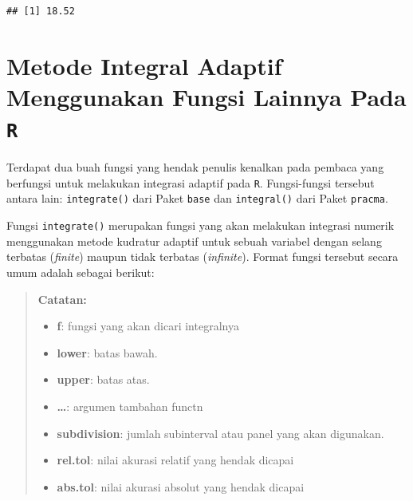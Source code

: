 \documentclass[
]{book}
\newenvironment{Shaded}{\begin{snugshade}}{\end{snugshade}}
\newcommand{\AttributeTok}[1]{\textcolor[rgb]{0.13,0.29,0.53}{#1}}
\newcommand{\FloatTok}[1]{\textcolor[rgb]{0.00,0.00,0.81}{#1}}
\newcommand{\FunctionTok}[1]{\textcolor[rgb]{0.13,0.29,0.53}{\textbf{#1}}}
\newcommand{\NormalTok}[1]{#1}
\newcommand{\SpecialCharTok}[1]{\textcolor[rgb]{0.81,0.36,0.00}{\textbf{#1}}}
\providecommand{\tightlist}{%
  \setlength{\itemsep}{0pt}\setlength{\parskip}{0pt}}
\theoremstyle{definition}
\theoremstyle{definition}
\theoremstyle{definition}
\theoremstyle{definition}
\theoremstyle{remark}
\begin{document}
\begin{verbatim}
## [1] 18.52
\end{verbatim}

\hypertarget{metode-integral-adaptif-menggunakan-fungsi-lainnya-pada-r}{%
\section{\texorpdfstring{Metode Integral Adaptif Menggunakan Fungsi Lainnya Pada \texttt{R}}{Metode Integral Adaptif Menggunakan Fungsi Lainnya Pada R}}\label{metode-integral-adaptif-menggunakan-fungsi-lainnya-pada-r}}

Terdapat dua buah fungsi yang hendak penulis kenalkan pada pembaca yang berfungsi untuk melakukan integrasi adaptif pada \texttt{R}. Fungsi-fungsi tersebut antara lain: \texttt{integrate()} dari Paket \texttt{base} dan \texttt{integral()} dari Paket \texttt{pracma}.

Fungsi \texttt{integrate()} merupakan fungsi yang akan melakukan integrasi numerik menggunakan metode kudratur adaptif untuk sebuah variabel dengan selang terbatas (\emph{finite}) maupun tidak terbatas (\emph{infinite}). Format fungsi tersebut secara umum adalah sebagai berikut:

\begin{Shaded}
\end{Shaded}

\begin{quote}
\textbf{Catatan:}

\begin{itemize}
\tightlist
\item
  \textbf{f}: fungsi yang akan dicari integralnya
\item
  \textbf{lower}: batas bawah.
\item
  \textbf{upper}: batas atas.
\item
  \textbf{\ldots{}}: argumen tambahan functn
\item
  \textbf{subdivision}: jumlah subinterval atau panel yang akan digunakan.
\item
  \textbf{rel.tol}: nilai akurasi relatif yang hendak dicapai
\item
  \textbf{abs.tol}: nilai akurasi absolut yang hendak dicapai
\end{itemize}
\end{quote}
\end{document}
